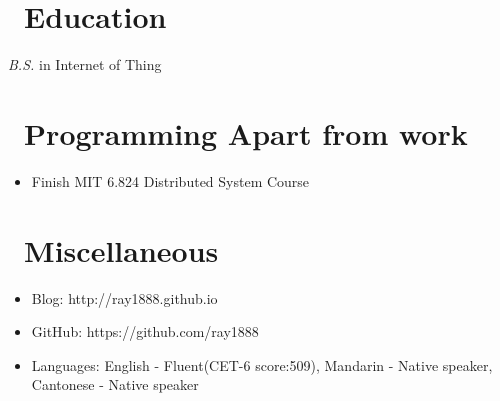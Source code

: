 \documentclass{resume}
\begin{document}
\section{\faGraduationCap\ Education}
\textit{B.S.} in Internet of Thing

\section{\faHeartO\ Programming Apart from work }
\begin{itemize} 
   \item Finish MIT 6.824 Distributed System Course 
\end {itemize}

\section{\faInfo\ Miscellaneous}
\begin{itemize}[parsep=0.5ex]
  \item Blog: http://ray1888.github.io 
  \item GitHub: https://github.com/ray1888
  \item Languages: English - Fluent(CET-6 score:509), Mandarin - Native speaker, Cantonese - Native speaker
\end{itemize}

%
%
\end{document}

